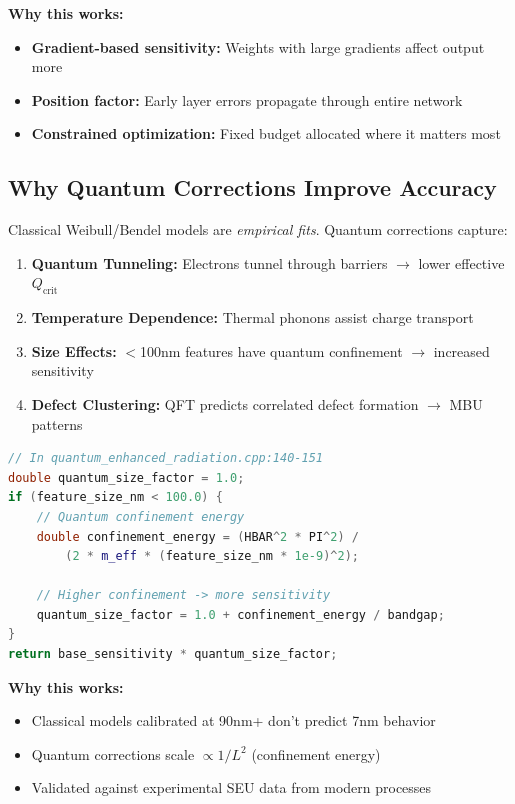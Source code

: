 \documentclass[11pt,a4paper]{article}
\begin{document}
\textbf{Why this works:}
\begin{itemize}
    \item \textbf{Gradient-based sensitivity:} Weights with large gradients affect output more
    \item \textbf{Position factor:} Early layer errors propagate through entire network
    \item \textbf{Constrained optimization:} Fixed budget allocated where it matters most
\end{itemize}

\subsection{Why Quantum Corrections Improve Accuracy}

Classical Weibull/Bendel models are \textit{empirical fits}. Quantum corrections capture:

\begin{tcolorbox}[colback=yellow!5!white,colframe=yellow!50!black,title=Quantum Effects Not in Classical Models]
\begin{enumerate}
    \item \textbf{Quantum Tunneling:} Electrons tunnel through barriers $\to$ lower effective $Q_{\text{crit}}$
    \item \textbf{Temperature Dependence:} Thermal phonons assist charge transport
    \item \textbf{Size Effects:} $<$100nm features have quantum confinement $\to$ increased sensitivity
    \item \textbf{Defect Clustering:} QFT predicts correlated defect formation $\to$ MBU patterns
\end{enumerate}
\end{tcolorbox}

\begin{lstlisting}[language=C++, basicstyle=\footnotesize\ttfamily]
// In quantum_enhanced_radiation.cpp:140-151
double quantum_size_factor = 1.0;
if (feature_size_nm < 100.0) {
    // Quantum confinement energy
    double confinement_energy = (HBAR^2 * PI^2) /
        (2 * m_eff * (feature_size_nm * 1e-9)^2);

    // Higher confinement -> more sensitivity
    quantum_size_factor = 1.0 + confinement_energy / bandgap;
}
return base_sensitivity * quantum_size_factor;
\end{lstlisting}

\textbf{Why this works:}
\begin{itemize}
    \item Classical models calibrated at 90nm+ don't predict 7nm behavior
    \item Quantum corrections scale $\propto 1/L^2$ (confinement energy)
    \item Validated against experimental SEU data from modern processes
\end{itemize}
\end{document}
